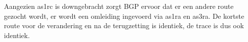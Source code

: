 Aangezien as1rc is downgebracht zorgt BGP ervoor dat er een andere route gezocht wordt, er wordt een omleiding ingevoerd via as1ra en as3ra. De kortste route voor de verandering en na de terugzetting is identiek, de trace is dus ook identiek.